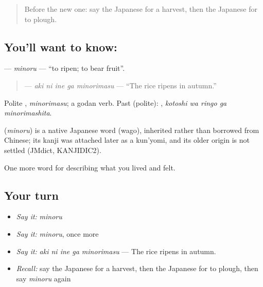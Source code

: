 \label{lesson:JA-C489-minoru}



\begin{quote}
Before the new one: say the Japanese for a harvest, then the Japanese for to plough.
\end{quote}

\subsection*{You'll want to know: }
\textbf{} — \emph{minoru} — \textquotedblleft{}to ripen; to bear fruit\textquotedblright{}.

\begin{quote}
\textbf{  } — \emph{aki ni ine ga minorimasu} — \textquotedblleft{}The rice ripens in autumn.\textquotedblright{}
\end{quote}

Polite \textbf{}, \emph{minorimasu}; a godan verb. Past (polite): \textbf{  }, \emph{kotoshi wa ringo ga minorimashita}.

\begin{cousinweb}
\textbf{} (\emph{minoru}) is a native Japanese word (wago), inherited rather than borrowed from Chinese; its kanji was attached later as a kun'yomi, and its older origin is not settled (JMdict, KANJIDIC2).
\end{cousinweb}

\begin{grammarlens}[title={What you've built}]
One more word for describing what you lived and felt.
\end{grammarlens}

\subsection*{Your turn}
\begin{itemize}
\raggedright
  \item \emph{Say it:} \emph{minoru}
  \item \emph{Say it:} \emph{minoru}, once more
  \item \emph{Say it:} \emph{aki ni ine ga minorimasu} — The rice ripens in autumn.
  \item \emph{Recall:} say the Japanese for a harvest, then the Japanese for to plough, then say \emph{minoru} again
\end{itemize}


